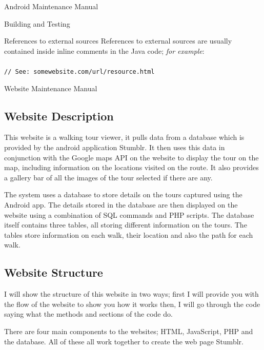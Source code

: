 \documentclass{article}
\begin{document}
\begin{section}{Android Maintenance Manual}
\begin{subsection}{Building and Testing}
		\begin{subsubsection}{References to external sources}
			References to external sources are usually contained inside inline comments in the Java code; {\em for example}: \\ \\
			{\tt // See: somewebsite.com/url/resource.html}
		\end{subsubsection}
	\end{subsection}
	\end{section}
	
	\begin{section}{Website Maintenance Manual}
		\subsection{Website Description}
		This website is a walking tour viewer, it pulls data from a database which is provided by the android application Stumblr. It then uses this data in conjunction with the Google maps API on the website to display the tour on the map, including information on the locations visited on the route. It also provides a gallery bar of all the images of the tour selected if there are any.
		
		The system uses a database to store details on the tours captured using the Android app. The details stored in the database are then displayed on the website using a combination of SQL commands and PHP scripts. The database itself contains three tables, all storing different information on the tours. The tables store information on each walk, their location and also the path for each walk. 

		\subsection{Website Structure}
		I will show the structure of this website in two ways; first I will provide you with the flow of the website to show you how it works then, I will go through the code saying what the methods and sections of the code do.

		There are four main components to the websites; HTML, JavaScript, PHP and the database. All of  these all work together to create the web page Stumblr. 


\end{section}
\end{document}
